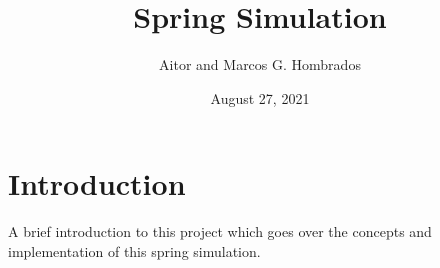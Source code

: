 \documentclass{article}
\begin{document}
\begin{titlepage}
	\title{Spring Simulation}
	\author{Aitor and Marcos G. Hombrados}
	\date{August 27, 2021}
	\maketitle
\end{titlepage}
\section{Introduction}\label{sec:intro}
A brief introduction to this project which goes over the concepts and implementation of this spring simulation.
\end{document}
